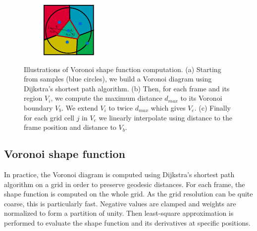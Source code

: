 \begin{figure}[!h]
\begin{subfigure}[b]{0.20\linewidth}
		\caption{\label{fig:buildSF2}}
	\end{subfigure}
	\hspace{2cm}
	\begin{subfigure}[b]{0.20\linewidth}
		\centering
		\includegraphics[width=\linewidth]{images/cutting-mig2015/buildSF_3.pdf}
		\caption{\label{fig:buildSF3}}
	\end{subfigure}
	\caption[Frame-based cutting: Voronoi shapefunction computation]{\label{fig:shapefunctionconstruction}
		Illustrations of Voronoi shape function computation. (a) Starting from samples (blue circles), we build a Voronoi diagram using Dijkstra's shortest path algorithm. (b) Then, for each frame and its region $V_{i}$, we compute the maximum distance $d_{max}$ to its Voronoi boundary $V_{b}$. We extend $V_{i}$ to twice $d_{max}$ which gives $V_{e}$. (c) Finally for each grid cell $j$ in $V_{e}$ we linearly interpolate using distance to the frame position and distance to $V_{b}$.}
\end{figure}

\subsection{Voronoi shape function}

In practice, the Voronoi diagram is computed using Dijkstra's shortest path algorithm on a grid in order to preserve geodesic distances. For each frame, the shape function is computed on the whole grid. As the grid resolution can be quite coarse, this is particularly fast. Negative values are clamped and weights are normalized to form a partition of unity. Then least-square approximation is performed to evaluate the shape function and its derivatives at specific positions.

